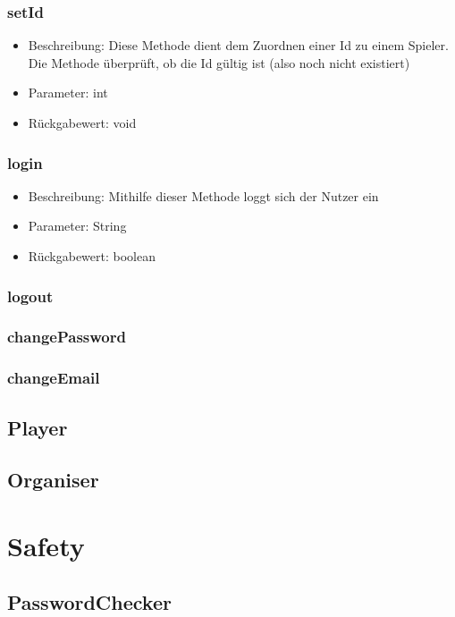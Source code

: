\documentclass[a4paper]{scrreprt}
\begin{document}
    \subsubsection{setId}
    \begin{itemize}
        \item Beschreibung: Diese Methode dient dem Zuordnen einer Id zu einem Spieler. Die Methode überprüft, ob die Id gültig ist (also noch nicht existiert)
        \item Parameter: int
        \item Rückgabewert: void
    \end{itemize}
    \subsubsection{login}
    \begin{itemize}
        \item Beschreibung: Mithilfe dieser Methode loggt sich der Nutzer ein
        \item Parameter: String
        \item Rückgabewert: boolean
    \end{itemize}
    \subsubsection{logout}
    \subsubsection{changePassword}
    \subsubsection{changeEmail}

    \subsection{Player}
    \subsection{Organiser}

    \section{Safety}
    \subsection{PasswordChecker}
\end{document}
